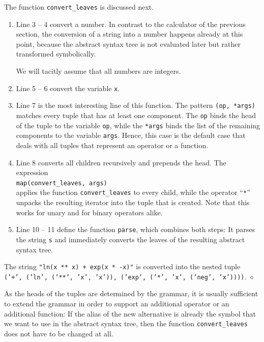 \noindent
The function \texttt{convert\_leaves} is discussed next.
\begin{enumerate}
\item Line 3 -- 4 convert a number.  In contrast to the calculator of the previous section, the conversion
      of a string into a number happens already at this point, because the abstract syntax tree is not
      evaluated later but rather transformed symbolically.

      We will tacitly assume that all numbers are integers.
\item Line 5 -- 6 convert the variable \texttt{x}.
\item Line 7 is the most interesting line of this function.  The pattern \texttt{(op, *args)} matches every
      tuple that has at least one component.  The  \texttt{op}
      binds the head of the tuple to the variable \texttt{op}, while the 
      \texttt{*args} binds the list of the remaining components to the variable \texttt{args}.  Hence, this
      case is the default case that deals with all tuples that represent an operator or a function.
\item Line 8 converts all children recursively and prepends the head.  The expression
      \\[0.2cm]
      \hspace*{1.3cm}
      \texttt{map(convert\_leaves, args)}
      \\[0.2cm]
      applies the function \texttt{convert\_leaves} to every child, while the operator ``\texttt{*}'' unpacks
      the resulting iterator into the tuple that is created.  Note that this works for unary and for binary
      operators alike.
\item Line 10 -- 11 define the function \texttt{parse}, which combines both steps:  It parses the string
      \texttt{s} and immediately converts the leaves of the resulting abstract syntax tree.
\end{enumerate}

\exampleEng
The string \texttt{"ln(x ** x) + exp(x * -x)"} is converted into the nested tuple
\\[0.2cm]
\hspace*{0.3cm}
\texttt{('+', ('ln', ('**', 'x', 'x')), ('exp', ('*', 'x', ('neg', 'x'))))}.
\hspace*{\fill} $\diamond$

\remarkEng
As the heads of the tuples are determined by the grammar, it is usually sufficient to extend the grammar in
order to support an additional operator or an additional function:  If the alias of the new alternative is
already the symbol that we want to use in the abstract syntax tree, then the function
\texttt{convert\_leaves} does not have to be changed at all.  \eox
\vspace*{0.1cm}

